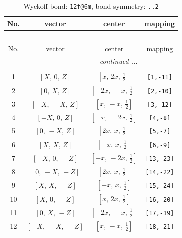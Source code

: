 \documentclass[fleqn,8pt]{jsarticle}
\begin{document}
\renewcommand{\arraystretch}{1.2}
\begin{longtable}{cccc}
\caption{Wyckoff bond: {\tt 12f@6m}, bond symmetry: {\tt ..2}}
 \\
 \hline \hline
No. & vector & center & mapping \\ \hline \endfirsthead

\multicolumn{3}{l}{\tablename\ \thetable{}} \\
 \hline \hline
No. & vector & center & mapping \\ \hline \endhead

 \hline \hline
\multicolumn{3}{r}{\footnotesize\it continued ...} \\ \endfoot

 \hline \hline
\multicolumn{3}{r}{} \\ \endlastfoot

1 & $\left[ X,\, 0,\, Z \right]$ & $\left[ x,\, 2 x,\, \frac{1}{2} \right]$ & {\tt [1,-11]} \\ \hline
2 & $\left[ 0,\, X,\, Z \right]$ & $\left[ - 2 x,\, - x,\, \frac{1}{2} \right]$ & {\tt [2,-10]} \\ \hline
3 & $\left[ - X,\, - X,\, Z \right]$ & $\left[ x,\, - x,\, \frac{1}{2} \right]$ & {\tt [3,-12]} \\ \hline
4 & $\left[ - X,\, 0,\, Z \right]$ & $\left[ - x,\, - 2 x,\, \frac{1}{2} \right]$ & {\tt [4,-8]} \\ \hline
5 & $\left[ 0,\, - X,\, Z \right]$ & $\left[ 2 x,\, x,\, \frac{1}{2} \right]$ & {\tt [5,-7]} \\ \hline
6 & $\left[ X,\, X,\, Z \right]$ & $\left[ - x,\, x,\, \frac{1}{2} \right]$ & {\tt [6,-9]} \\ \hline
7 & $\left[ - X,\, 0,\, - Z \right]$ & $\left[ - x,\, - 2 x,\, \frac{1}{2} \right]$ & {\tt [13,-23]} \\ \hline
8 & $\left[ 0,\, - X,\, - Z \right]$ & $\left[ 2 x,\, x,\, \frac{1}{2} \right]$ & {\tt [14,-22]} \\ \hline
9 & $\left[ X,\, X,\, - Z \right]$ & $\left[ - x,\, x,\, \frac{1}{2} \right]$ & {\tt [15,-24]} \\ \hline
10 & $\left[ X,\, 0,\, - Z \right]$ & $\left[ x,\, 2 x,\, \frac{1}{2} \right]$ & {\tt [16,-20]} \\ \hline
11 & $\left[ 0,\, X,\, - Z \right]$ & $\left[ - 2 x,\, - x,\, \frac{1}{2} \right]$ & {\tt [17,-19]} \\ \hline
12 & $\left[ - X,\, - X,\, - Z \right]$ & $\left[ x,\, - x,\, \frac{1}{2} \right]$ & {\tt [18,-21]} \\
\end{longtable}
\end{document}
